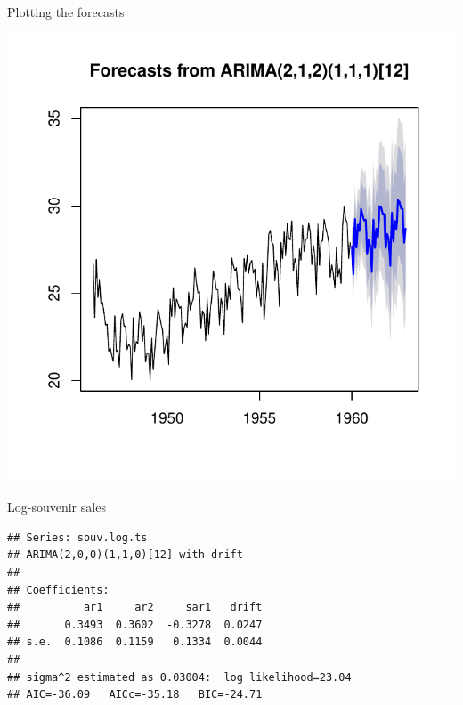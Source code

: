 \begin{frame}[fragile]{Plotting the forecasts}

\begin{knitrout}
\color{fgcolor}\begin{kframe}
\begin{alltt}
\end{alltt}
\end{kframe}
\includegraphics[width=\maxwidth]{figure/bradford-1} 

\end{knitrout}
  
\end{frame}

\begin{frame}[fragile]{Log-souvenir sales}
  
\begin{knitrout}
\color{fgcolor}\begin{kframe}
\begin{alltt}
\hlkwb{=}
\end{alltt}
\begin{verbatim}
## Series: souv.log.ts 
## ARIMA(2,0,0)(1,1,0)[12] with drift         
## 
## Coefficients:
##          ar1     ar2     sar1   drift
##       0.3493  0.3602  -0.3278  0.0247
## s.e.  0.1086  0.1159   0.1334  0.0044
## 
## sigma^2 estimated as 0.03004:  log likelihood=23.04
## AIC=-36.09   AICc=-35.18   BIC=-24.71
\end{verbatim}
\begin{alltt}
\hlkwb{=}\hlstd{=}\hlstd{)}
\end{alltt}
\end{kframe}
\end{knitrout}
  
\end{frame}

